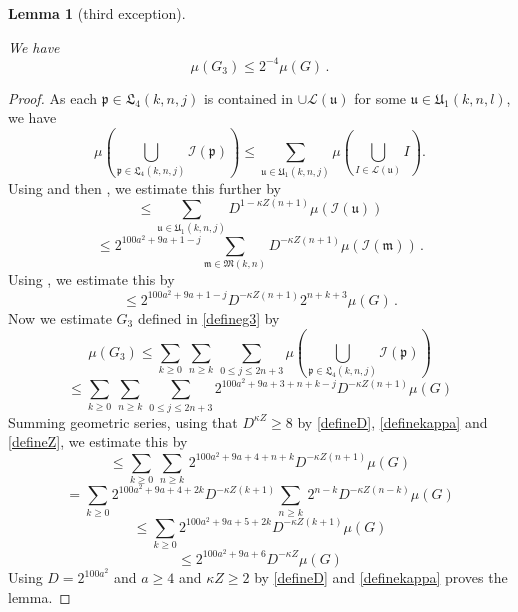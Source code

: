 \documentclass[10pt,a4paper]{article}
\theoremstyle{plain}
\newtheorem{lemma}[theorem]{Lemma}
\theoremstyle{definition}
\numberwithin{equation}{subsection}
\newcommand{\fp}{{\mathfrak p}}
\newcommand{\fu}{{\mathfrak u}}
\newcommand{\fU}{{\mathfrak U}}
\newcommand{\fL}{{\mathfrak L}}
\newcommand{\scI}{{\mathcal{I}}} %
\newcommand{\lean}[1]{}
\newcommand{\uses}[1]{}
\newcommand{\leanok}{}
\begin{document}
\begin{lemma}[third exception]
    \label{third-exception}
    \leanok
    \lean{third_exception}
\uses{tree-count,boundary-exception, top-tiles}
       We have
\begin{equation}
    \mu(G_3)\le 2^{-4} \mu(G)\, .
\end{equation}
\end{lemma}
\begin{proof}
\leanok
As each $\fp\in \fL_4(k,n,j)$
is contained in $\cup\mathcal{L}(\fu)$ for some
$\fu\in \fU_1(k,n,l)$, we have
\begin{equation}
\mu(\bigcup_{\fp \in \fL_4 (k,n,j)}\scI(\fp))
\le \sum_{\fu\in \fU_1(k,n,j)}
\mu(\bigcup_{I \in \mathcal{L} (\fu)}I).
\end{equation}
Using  and then , we estimate this further
 by
\begin{equation}
    \le \sum_{\fu\in \fU_1(k,n,j)}
    D^{1-\kappa Z(n+1)}
        \mu(\scI(\mathfrak{u}))
\end{equation}
\begin{equation}
    \le 2^{100a^2+9a+1-j} \sum_{\mathfrak{m}\in \mathfrak{M}(k,n)}
     D^{-\kappa Z(n+1)}
    \mu(\scI(\mathfrak{m}))\,.
\end{equation}
Using , we estimate this by
  \begin{equation}
     \le
2^{100a^2 + 9a + 1-j} D^{-\kappa Z(n+1)}
     2^{n+k+3}\mu(G)\, .
\end{equation}
Now we estimate $G_3$ defined in \eqref{defineg3} by
\begin{equation}
    \mu(G_3)\le \sum_{k\ge 0}\, \sum_{n \geq k}\,
    \sum_{0\le j\le 2n+3}
    \mu(\bigcup_{\fp \in \fL_4 (k,n,j)}
    \scI(\fp))
\end{equation}
\begin{equation}
    \le \sum_{k\ge 0}\, \sum_{n \geq k}\,
    \sum_{0\le j\le 2n+3}
    2^{100a^2 + 9a + 3 + n + k -j} D^{-\kappa Z(n+1)}\mu(G)
\end{equation}
Summing geometric series, using that $D^{\kappa Z}\ge 8$ by \eqref{defineD}, \eqref{definekappa} and \eqref{defineZ}, we estimate this by
\begin{equation}
    \le \sum_{k\ge 0}\, \sum_{n \geq k}\,
    2^{100a^2 + 9a + 4 + n + k} D^{-\kappa Z(n+1)}\mu(G)
\end{equation}
\begin{equation}
    = \sum_{k\ge 0} 2^{100a^2 + 9a + 4 + 2k} D^{-\kappa Z(k+1)} \sum_{n \geq k}\,
    2^{n - k} D^{-\kappa Z(n-k)}\mu(G)
\end{equation}
\begin{equation}
    \le \sum_{k\ge 0} 2^{100a^2 + 9a + 5 + 2k} D^{-\kappa Z(k+1)}\mu(G)
\end{equation}
\begin{equation}
   \le 2^{100a^2 + 9a + 6} D^{-\kappa Z}\mu(G)
\end{equation}
Using $D = 2^{100a^2}$ and $a \ge 4$ and $\kappa Z \ge 2$ by \eqref{defineD} and \eqref{definekappa} proves the lemma.
\end{proof}
\end{document}
